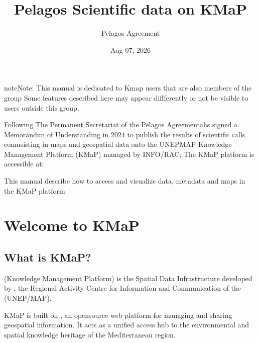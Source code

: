 \documentclass[letterpaper,10pt,english]{sphinxmanual}
\title{Pelagos Scientific data on KMaP}
\date{Aug 07, 2026}
\author{Pelagos Agreement}
\begin{document}
\pagestyle{empty}
\sphinxmaketitle
\pagestyle{plain}
\sphinxtableofcontents
\pagestyle{normal}
\label{\detokenize{index::doc}}\label{\detokenize{index:kmap-documentation}}


\sphinxAtStartPar
{}

\begin{sphinxadmonition}{note}{Note:}
\sphinxAtStartPar
This manual is dedicated to Kmap users that are also members of the  group
Some features described here may appear diffferently or not be visible to users outside
this group.
\end{sphinxadmonition}

\sphinxAtStartPar
Following The Permanent Secretariat of the Pelagos Agreementahs signed a Memorandun of Understanding in 2024
to publish the results of scientific calls conmsisting in
maps and geospatial data onto the UNEP\sphinxhyphen{}MAP Knowledge Management Platform (KMaP) managed by INFO/RAC;
The KMaP platform is accessible at: 

\sphinxAtStartPar
This manual describe how to access and visualize data, metadata and maps in the KMaP platform

\begin{figure}[htbp]
\centering

\noindent{}
\end{figure}

\sphinxstepscope


\chapter{Welcome to KMaP}
\label{\detokenize{01_welcome:welcome-to-kmap}}\label{\detokenize{01_welcome:welcome-en}}\label{\detokenize{01_welcome::doc}}

\section{What is KMaP?}
\label{\detokenize{01_welcome:what-is-kmap}}
\sphinxAtStartPar
{} (Knowledge Management Platform) is the Spatial Data Infrastructure developed by
, the Regional Activity Centre for Information and Communication of the
 (UNEP/MAP).

\sphinxAtStartPar
KMaP is built on , an open\sphinxhyphen{}source web platform for
managing and sharing geospatial information. It acts as a unified access hub to the
environmental and spatial knowledge heritage of the Mediterranean region.
\end{document}
